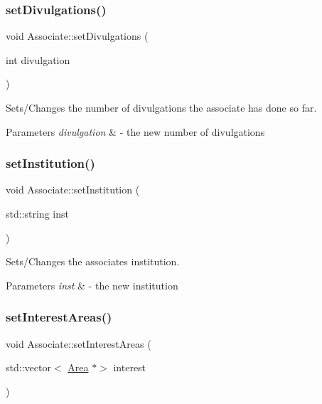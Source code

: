 \subsubsection{\texorpdfstring{set\+Divulgations()}{setDivulgations()}}
{\footnotesize\ttfamily void Associate\+::set\+Divulgations (\begin{DoxyParamCaption}\item[{int}]{divulgation }\end{DoxyParamCaption})}



Sets/\+Changes the number of divulgations the associate has done so far. 


\begin{DoxyParams}{Parameters}
{\em divulgation} & -\/ the new number of divulgations \\
\hline
\end{DoxyParams}
\mbox{\label{classAssociate_aa441347cdbef813e4603d2c67e0822fb}} 
\subsubsection{\texorpdfstring{set\+Institution()}{setInstitution()}}
{\footnotesize\ttfamily void Associate\+::set\+Institution (\begin{DoxyParamCaption}\item[{std\+::string}]{inst }\end{DoxyParamCaption})}



Sets/\+Changes the associate\textquotesingle{}s institution. 


\begin{DoxyParams}{Parameters}
{\em inst} & -\/ the new institution \\
\hline
\end{DoxyParams}
\mbox{\label{classAssociate_a5b416da0898fd5dda854eb0027e9e8a1}} 
\subsubsection{\texorpdfstring{set\+Interest\+Areas()}{setInterestAreas()}}
{\footnotesize\ttfamily void Associate\+::set\+Interest\+Areas (\begin{DoxyParamCaption}\item[{std\+::vector$<$ \mbox{\hyperlink{classArea}{Area}} $\ast$$>$}]{interest }\end{DoxyParamCaption})}



